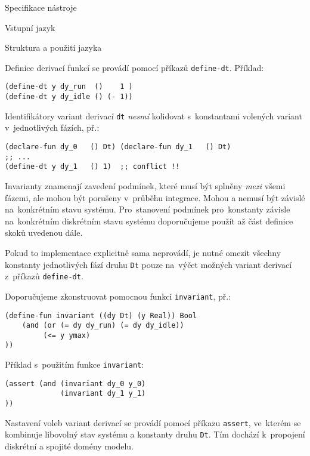\documentclass[thesis=M,czech]{FITthesis}[2012/06/26]
\newcommand{\id}[1]{\texttt{#1}}
\newcommand{\hl}[1]{\textit{#1}}
\begin{document}
\begin{section}{Specifikace nástroje}
\begin{subsection}{Vstupní jazyk}
\begin{subsubsection}{Struktura a použití jazyka}

\begin{paragraph}{Definice derivací funkcí}
\label{p:design:spec:ilang:struct:ode}
se provádí pomocí příkazů \id{define\--dt}.
Příklad:
\begin{Verbatim}[samepage=true]
(define-dt y dy_run  ()    1 )
(define-dt y dy_idle () (- 1))
\end{Verbatim}

Identifikátory variant derivací \id{dt}
\hl{nesmí} kolidovat s~konstantami
volených variant v~jednotlivých fázích, př.:
\begin{Verbatim}[samepage=true]
(declare-fun dy_0   () Dt) (declare-fun dy_1   () Dt)
;; ...
(define-dt y dy_1   () 1)  ;; conflict !!
\end{Verbatim}
\end{paragraph} %


\begin{paragraph}{Invarianty}
\label{p:design:spec:ilang:struct:inv}
znamenají zavedení podmínek,
které musí být splněny \hl{mezi} všemi fázemi,
ale mohou být porušeny v~průběhu integrace.
Mohou a nemusí být závislé na~konkrétním stavu systému.
Pro~stanovení podmínek pro~konstanty závisle
na~konkrétním diskrétním stavu systému
doporučujeme použít až část definice skoků uvedenou dále.

Pokud to implementace explicitně sama neprovádí,
je nutné omezit všechny konstanty jednotlivých fází druhu \id{Dt}
pouze na~výčet možných variant derivací z~příkazů \id{define\--dt}.

Doporučujeme zkonstruovat pomocnou funkci \id{invariant}, př.:
\begin{Verbatim}[samepage=true]
(define-fun invariant ((dy Dt) (y Real)) Bool
    (and (or (= dy dy_run) (= dy dy_idle))
         (<= y ymax)
))
\end{Verbatim}

Příklad s~použitím funkce \id{invariant}:
\begin{Verbatim}[samepage=true]
(assert (and (invariant dy_0 y_0)
             (invariant dy_1 y_1)
))
\end{Verbatim}
\end{paragraph} %


\begin{paragraph}{Nastavení voleb variant derivací}
\label{p:design:spec:ilang:struct:connect}
se provádí pomocí příkazu \id{assert},
ve~kterém se kombinuje libovolný stav systému
a konstanty druhu \id{Dt}.
Tím dochází k~propojení diskrétní a spojité domény modelu.


\end{paragraph}
\end{subsubsection}
\end{subsection}
\end{section}
\end{document}
